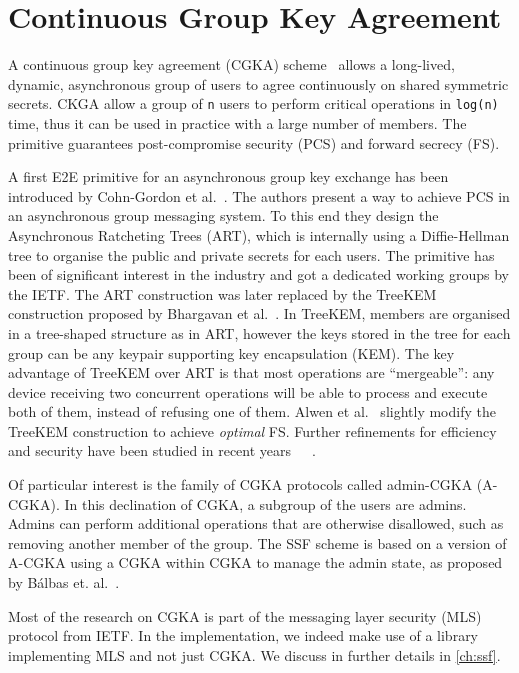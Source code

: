 \section{Continuous Group Key Agreement}\label{sc:CGKA}

A continuous group key agreement (CGKA) scheme~\cite{C:ACDT20}
allows a long-lived, dynamic, asynchronous group of users to agree 
continuously on shared symmetric secrets.
CKGA allow a group of \texttt{n} users to perform critical 
operations in \texttt{log(n)} time,
thus it can be used in practice with a large number of members.
The primitive guarantees post-compromise security (PCS) and forward secrecy (FS).

A first E2E primitive for an asynchronous group key exchange 
has been introduced by Cohn-Gordon et al.~\cite{CCS:CCGMM18}.
The authors present a way to achieve PCS in an asynchronous group messaging system. 
To this end they design the Asynchronous Ratcheting Trees (ART),
which is internally using a Diffie-Hellman tree to organise the
public and private secrets for each users.
The primitive has been of significant interest in the industry and
got a dedicated working groups by the IETF.
The ART construction was later replaced by the TreeKEM
construction proposed by Bhargavan et al.~\cite{TreeKEM}.
In TreeKEM, members are organised in a tree-shaped structure
as in ART, however the keys stored in the tree for each group
can be any keypair supporting key encapsulation (KEM).
The key advantage of TreeKEM over ART is that
most operations are ``mergeable'':
any device receiving two
concurrent operations will be able to process and execute both of them,
instead of refusing one of them.
Alwen et al.~\cite{C:ACDT20} slightly modify the TreeKEM construction
to achieve \textit{optimal} FS. Further refinements for efficiency
and security have been studied in recent years~\cite{CCS:ACDT21}~\cite{EC:AANKPPW22}~\cite{C:AlwMulTse23}.

Of particular interest is the family of CGKA protocols called admin-CGKA (A-CGKA).
In this declination of CGKA, a subgroup of the users are admins. 
Admins can perform additional operations that are otherwise disallowed, such as removing another member of the group.
The SSF scheme is based on a version of A-CGKA using a CGKA within CGKA to manage the admin state, as proposed by
B{\'a}lbas et. al.~\cite{USENIX:BalColVau23}.

Most of the research on CGKA is part of the messaging layer security (MLS) protocol from IETF.
In the implementation, we indeed make use of a library implementing MLS and not just CGKA.
We discuss in further details in \cref{ch:ssf}.

